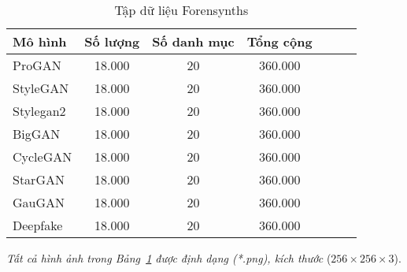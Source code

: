 \begin{table}[h]%
	\scriptsize 
	\renewcommand{\arraystretch}{1.2} %
	\centering
	\caption{Tập dữ liệu Forensynths}
	\label{tab:forensynths-dataset}
	\begin{tabular}{|l|c|c|c|c|c|c|}
		\hline
		\textbf{Mô hình} & \textbf{Số lượng} & \textbf{Số danh mục} & \textbf{Tổng cộng} \\ \hline
		ProGAN & 18.000 & 20 & 360.000 \\ 
		StyleGAN  & 18.000 & 20 & 360.000 \\ 
		Stylegan2 & 18.000 & 20 & 360.000 \\  
		BigGAN & 18.000 & 20 & 360.000 \\  
		CycleGAN & 18.000 & 20 & 360.000 \\  
		StarGAN & 18.000 & 20 & 360.000 \\  
		GauGAN & 18.000 & 20 & 360.000 \\  
		Deepfake & 18.000 & 20 & 360.000 \\ 
		\hline
	\end{tabular}
\end{table}

\vspace{-0.1cm} %
\textit{Tất cả hình ảnh trong {Bảng}~\ref{tab:forensynths-dataset} được định dạng (*.png), kích thước} (\( \mathit{256 \times 256 \times 3} \)).

